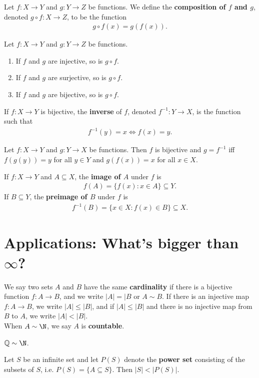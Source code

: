\documentclass{article}
\begin{document}
\begin{definition}
    Let $f:X\to Y$ and $g:Y\to Z$ be functions. We define the \textbf{composition of $f$ and $g$}, denoted $g\circ f:X\to Z$, to be the function
    \begin{align*}
        g\circ f(x) = g(f(x)).
    \end{align*}
\end{definition}
\begin{theorem}
    Let $f:X\to Y$ and $g:Y\to Z$ be functions.
    \begin{enumerate}
        \item If $f$ and $g$ are injective, so is $g\circ f$.
        \item If $f$ and $g$ are surjective, so is $g\circ f$.
        \item If $f$ and $g$ are bijective, so is $g\circ f$.
    \end{enumerate}
\end{theorem}
\begin{definition}
    If $f:X\to Y$ is bijective, the \textbf{inverse} of $f$, denoted $f^{-1}:Y\to X$, is the function such that
    \begin{align*}
        f^{-1}(y) = x \Leftrightarrow f(x) = y.
    \end{align*}
\end{definition}
\begin{theorem}
    Let $f:X\to Y$ and $g:Y\to X$ be functions. Then $f$ is bijective and $g=f^{-1}$ iff $f(g(y))= y$ for all $y\in Y$ and $g(f(x))=x$ for all $x\in X$.
\end{theorem}
\begin{definition}
    If $f:X\to Y$ and $A\subseteq X$, the \textbf{image of $A$} under $f$ is
    \begin{align*}
        f(A) = \{f(x):x\in A\}\subseteq Y.
    \end{align*}
    If $B\subseteq Y$, the \textbf{preimage of $B$} under $f$ is
    \begin{align*}
        f^{-1}(B) = \{x\in X:f(x)\in B\}\subseteq X.
    \end{align*}
\end{definition}
\section*{Applications: What's bigger than $\infty$?}
\begin{definition}
    We say two sets $A$ and $B$ have the same \textbf{cardinality} if there is a bijective function $f:A\to B$, and we write $|A|=|B$ or $A\sim B$. If there is an injective map $f:A\to B$, we write $|A|\leq |B|$, and if $|A|\leq |B|$ and there is no injective map from $B$ to $A$, we write $|A|<|B|$.\\
    When $A\sim\N$, we say $A$ is \textbf{countable}.
\end{definition}
\begin{theorem}
    $\mathbb{Q}\sim\N$.
\end{theorem}
\begin{theorem}
    Let $S$ be an infinite set and let $P(S)$ denote the \textbf{power set} consisting of the subsets of $S$, i.e. $P(S) = \{A\subseteq S\}$. Then $|S|<|P(S)|$.
\end{theorem}
\end{document}
